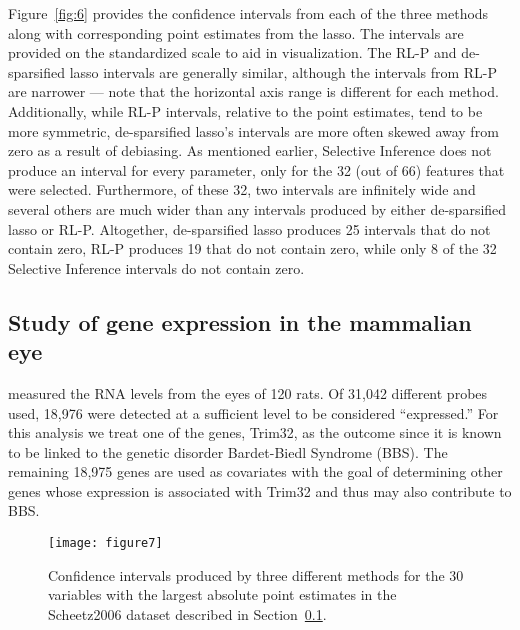 Figure~\ref{fig:6} provides the confidence intervals from each of the three methods along with corresponding point estimates from the lasso. The intervals are provided on the standardized scale to aid in visualization. The RL-P and de-sparsified lasso intervals are generally similar, although the intervals from RL-P are narrower --- note that the horizontal axis range is different for each method. Additionally, while RL-P intervals, relative to the point estimates, tend to be more symmetric, de-sparsified lasso's intervals are more often skewed away from zero as a result of debiasing. As mentioned earlier, Selective Inference does not produce an interval for every parameter, only for the 32 (out of 66) features that were selected. Furthermore, of these 32, two intervals are infinitely wide and several others are much wider than any intervals produced by either de-sparsified lasso or RL-P. Altogether, de-sparsified lasso produces 25 intervals that do not contain zero, RL-P produces 19 that do not contain zero, while only 8 of the 32 Selective Inference intervals do not contain zero.

\subsection{Study of gene expression in the mammalian eye}\label{Sec:Scheetz2006}

\citet{Scheetz2006} measured the RNA levels from the eyes of 120 rats. Of 31,042 different probes used, 18,976 were detected at a sufficient level to be considered ``expressed.'' For this analysis we treat one of the genes, Trim32, as the outcome since it is known to be linked to the genetic disorder Bardet-Biedl Syndrome (BBS). The remaining 18,975 genes are used as covariates with the goal of determining other genes whose expression is associated with Trim32 and thus may also contribute to BBS.

\begin{figure}[htb!]
  \begin{center}
    \texttt{[image: figure7]}
    \caption{\label{fig:7} Confidence intervals produced by three different methods for the 30 variables with the largest absolute point estimates in the Scheetz2006 dataset described in Section~\ref{Sec:Scheetz2006}.}
  \end{center}
\end{figure}

